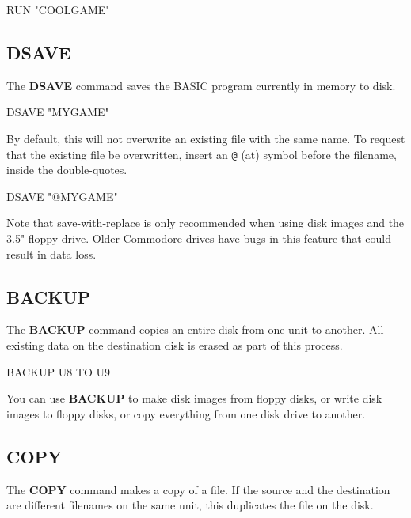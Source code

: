 \begin{screencode}
RUN "COOLGAME"
\end{screencode}

\subsection{DSAVE}

The {\bf DSAVE} command saves the BASIC program currently in memory to disk.

\begin{screencode}
DSAVE "MYGAME"
\end{screencode}

By default, this will not overwrite an existing file with the same name. To request that the existing file be overwritten, insert an {\tt @} (at) symbol before the filename, inside the double-quotes.

\begin{screencode}
DSAVE "@MYGAME"
\end{screencode}

Note that save-with-replace is only recommended when using disk images and the 3.5" floppy drive. Older Commodore drives have bugs in this feature that could result in data loss.

\subsection{BACKUP}

The {\bf BACKUP} command copies an entire disk from one unit to another. All existing data on the destination disk is erased as part of this process.

\begin{screencode}
BACKUP U8 TO U9
\end{screencode}

You can use {\bf BACKUP} to make disk images from floppy disks, or write disk images to floppy disks, or copy everything from one disk drive to another.

\subsection{COPY}

The {\bf COPY} command makes a copy of a file. If the source and the destination are different filenames on the same unit, this duplicates the file on the disk.


